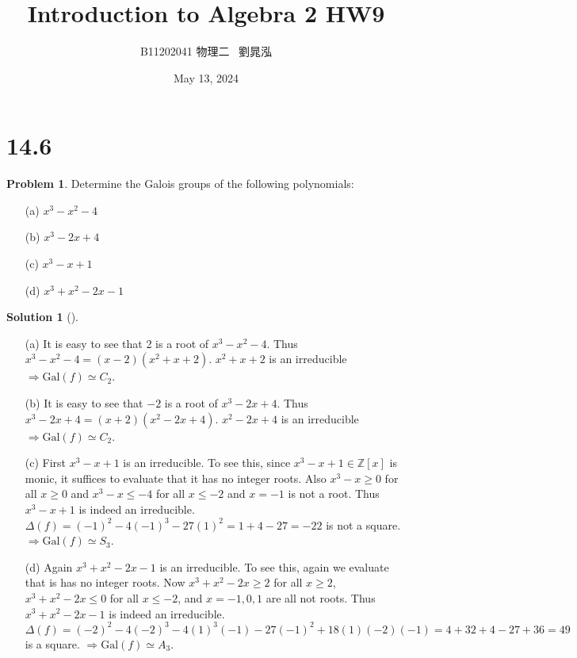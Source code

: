 \documentclass{article}
\title{Introduction to Algebra 2 HW9}
\author{B11202041 物理二 \, 劉晁泓}
\date{May 13, 2024}
\theoremstyle{definition}
\newtheorem{prob}{Problem}
\newtheorem*{sol}{Solution}
\newenvironment{sols}[1][]{%
  \begin{sol}[#1]$ $\par\nobreak\ignorespaces
}{%
  \end{sol}
}
\newcommand{\ZZ}{\mathbb Z}
\newcommand{\Ra}{\Rightarrow}
\newcommand{\Gal}{\text{Gal}}
\begin{document}
\maketitle
\thispagestyle{fancy}
\renewcommand{\footrulewidth}{0.4pt}
\cfoot{\thepage}
\renewcommand{\headrulewidth}{0.4pt}

\section*{14.6}

\setcounter{prob}{1}
\begin{prob}
	Determine the Galois groups of the following polynomials:
	\begin{enumerate}
		\item[(a)] $x^3 - x^2 - 4$

		\item[(b)] $x^3 - 2x + 4$

		\item[(c)] $x^3 - x + 1$

		\item[(d)] $x^3 + x^2 - 2x - 1$ 
	\end{enumerate}
\end{prob}

\begin{sols}
	\begin{enumerate}
		\item[(a)] It is easy to see that 2 is a root of $x^3 - x^2 - 4$.
			Thus $x^3 - x^2 - 4 = (x - 2) (x^2 + x + 2)$.
			$x^2 + x + 2$ is an irreducible $\Ra \Gal(f) \simeq C_2$.

		\item[(b)] It is easy to see that $-2$ is a root of $x^3 - 2x + 4$.
			Thus $x^3 - 2x + 4 = (x + 2) (x^2 - 2x + 4)$.
			$x^2 - 2x + 4$ is an irreducible $\Ra \Gal(f) \simeq C_2$.

		\item[(c)] First $x^3 - x + 1$ is an irreducible.
			To see this, since $x^3 - x + 1 \in \ZZ[x]$ is monic, it suffices to evaluate that it has no integer roots.
			Also $x^3 - x \geq 0$ for all $x \geq 0$ and $x^3 - x \leq -4$ for all $x \leq -2$ and $x = -1$ is not a root.
			Thus $x^3 - x + 1$ is indeed an irreducible.
			$\Delta(f) = (-1)^2 - 4 (-1)^3 - 27 (1)^2 = 1 + 4 - 27 = -22$ is not a square.
			$\Ra \Gal(f) \simeq S_3$.

		\item[(d)] Again $x^3 + x^2 - 2x - 1$ is an irreducible.
			To see this, again we evaluate that is has no integer roots.
			Now $x^3 + x^2 - 2x \geq 2$ for all $x \geq 2$, $x^3 + x^2 - 2x \leq 0$ for all $x \leq -2$, and $x = -1, 0, 1$ are all not roots.
			Thus $x^3 + x^2 - 2x - 1$ is indeed an irreducible.
			$\Delta(f) = (-2)^2 - 4 (-2)^3 - 4 (1)^3(-1) - 27 (-1)^2 + 18 (1)(-2)(-1) = 4 + 32 + 4 - 27 + 36 = 49$ is a square.
			$\Ra \Gal(f) \simeq A_3$.
	\end{enumerate}
\end{sols}
\end{document}
